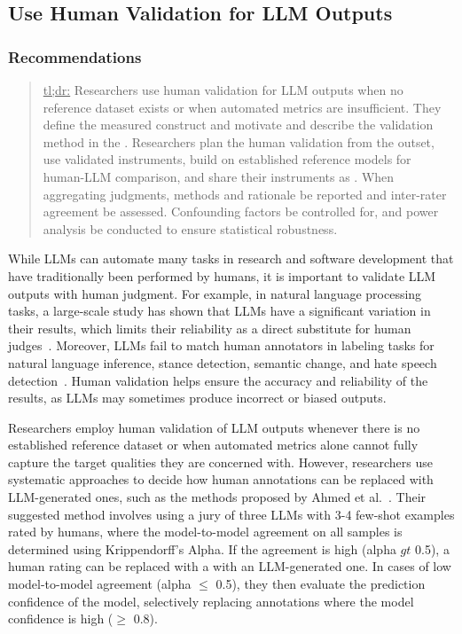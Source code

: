 



\subsection{Use Human Validation for LLM Outputs}

\subsubsection{Recommendations}

\begin{quote}
\underline{tl;dr:} Researchers \must use human validation for LLM outputs when no reference dataset exists or when automated metrics are insufficient. They \must define the measured construct and motivate and describe the validation method in the \paper. Researchers \should plan the human validation from the outset, use validated instruments, build on established reference models for human-LLM comparison, and share their instruments as \supplementarymaterial. When aggregating judgments, methods and rationale \should be reported and inter-rater agreement \should be assessed. Confounding factors \should be controlled for, and power analysis \should be conducted to ensure statistical robustness.
\end{quote}

While LLMs can automate many tasks in research and software development that have traditionally been performed by humans, it is important to validate LLM outputs with human judgment.
For example, in natural language processing tasks, a large-scale study has shown that LLMs have a significant variation in their results, which limits their reliability as a direct substitute for human judges~\cite{DBLP:journals/corr/abs-2406-18403}. 
Moreover, LLMs fail to match human annotators in labeling tasks for natural language inference, stance detection, semantic change, and hate speech detection~\cite{DBLP:conf/chi/Wang0RMM24}.
Human validation helps ensure the accuracy and reliability of the results, as LLMs may sometimes produce incorrect or biased outputs.

Researchers \must employ human validation of LLM outputs whenever there is no established reference dataset or when automated metrics alone cannot fully capture the target qualities they are concerned with.
However, researchers \should use systematic approaches to decide how human annotations can be replaced with LLM-generated ones, such as the methods proposed by Ahmed et al.~\cite{DBLP:journals/corr/abs-2408-05534}.
Their suggested method involves using a jury of three LLMs with 3-4 few-shot examples rated by humans, where the model-to-model agreement on all samples is determined using Krippendorff's Alpha.
If the agreement is high (alpha $gt$ 0.5), a human rating can be replaced with a with an LLM-generated one.
In cases of low model-to-model agreement (alpha $\le$ 0.5), they then evaluate the prediction confidence of the model, selectively replacing annotations where the model confidence is high ($\ge$ 0.8).

